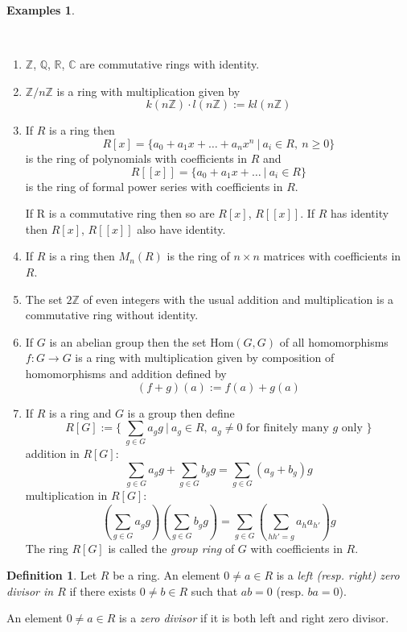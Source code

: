 \documentclass[12pt, letterpaper, oneside]{article}
\theoremstyle{plain}
\theoremstyle{definition}
\newtheorem{definition}[theorem]{Definition}
\newtheorem{examples}[theorem]{Examples}
\newcommand{\Z}{{\mathbb Z}}
\newcommand{\Q}{{\mathbb Q}}
\newcommand{\R}{{\mathbb R}}
\newcommand{\C}{{\mathbb C}}
\newcommand{\Hom}{\mathrm{Hom}}
\newcommand{\benu}{\begin{enumerate}}
\newcommand{\eenu}{\end{enumerate}}
\newcommand{\vs}{\vskip 5mm}
\newcommand{\isep}[1][0]{\setlength{\itemsep}{#1 mm}}
\begin{document}
\vs\vs


\begin{examples}\ 

\vskip -13mm

\ 
\benu
\isep[5]
\item $\Z$, $\Q$, $\R$, $\C$ are commutative rings with identity. 

\item $\Z/n\Z$ is a ring with multiplication given by 
$$k(n\Z) \cdot l(n\Z) := kl(n\Z)$$

\item If $R$ is a ring then 
$$R[x] = \{ a_{0}+a_{1}x +{\dots} + a_{n}x^{n} \ | \  a_{i}\in R, \ n \geq 0 \}$$
is the ring of polynomials with coefficients in $R$ and 
$$R[[x]] = \{a_{0} +a_{1}x+ \dots \ | \ a_{i}\in R \}$$
is the ring of formal power series with coefficients in $R$.

If R is a commutative ring then so are $R[x]$, $R[[x]]$. If $R$ has identity then 
$R[x]$, $R[[x]]$ also have identity.

\item  If $R$ is a ring then $M_{n}(R)$ is the ring of $n\times n$ matrices with coefficients in $R$.

\item The set $2\Z$ of even integers with the usual addition and multiplication is a commutative 
ring without identity.

\item If $G$ is an abelian group then the set $\Hom(G, G)$ of all homomorphisms $f\colon G \to G$
is a ring with multiplication given by composition of  homomorphisms and addition defined by 
$$(f+g)(a) := f(a)+g(a)$$

\item If $R$ is a ring and $G$ is a group then define
$$ R[G] := \{ \ \sum_{g\in G} a_{g}g \ | \ a_{g} \in R, \ a_{g}\neq 0 \text{ for finitely many $g$ only }\}$$
addition in $R[G]$:
$$\sum_{g\in G} a_{g}g + \sum_{g\in G} b_{g}g = \sum_{g\in G} (a_{g}+b_{g})g$$
multiplication in $R[G]$:
$$\left(\sum_{g\in G} a_{g}g\right)\left( \sum_{g\in G} b_{g}g\right) = 
\sum_{g\in G}\left(\sum_{hh'=g} a_{h}a_{h'}\right)g$$
The ring $R[G]$ is called the \emph{group ring} of $G$ with coefficients in $R$.
\eenu

\end{examples}



\vs\vs


\begin{definition}
Let $R$ be a ring. An element $0\neq a\in R$ is a \emph{left (resp. right) zero divisor in $R$} if
there exists $0\neq b\in R$ such that $ab=0$ (resp. $ba=0$). 

An element $0\neq a\in R$ is a \emph{zero divisor} if it is both left and right zero divisor.
\end{definition}
\end{document}
